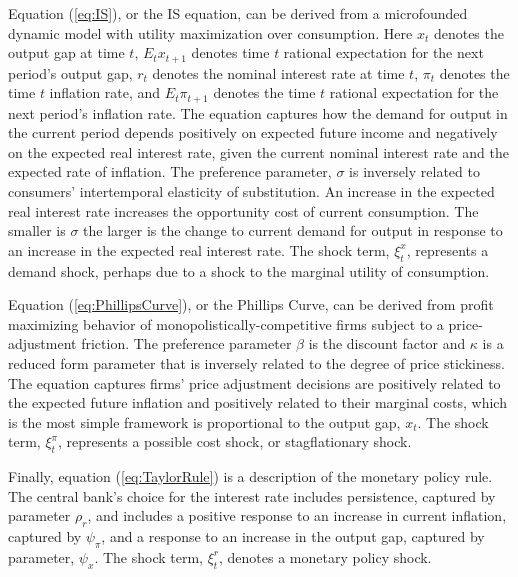 \documentclass[english,authoryear,12pt]{elsarticle}
\begin{document}
Equation (\ref{eq:IS}), or the IS equation, can be derived from a microfounded dynamic model with utility maximization over consumption. Here $x_t$ denotes the output gap at time $t$, $E_t x_{t+1}$ denotes time $t$ rational expectation for the next period's output gap, $r_t$ denotes the nominal interest rate at time $t$, $\pi_t$ denotes the time $t$ inflation rate, and  $E_t \pi_{t+1}$ denotes the time $t$ rational expectation for the next period's inflation rate. The equation captures how the demand for output in the current period depends positively on expected future income and negatively on the expected real interest rate, given the current nominal interest rate and the expected rate of inflation. The preference parameter, $\sigma$ is inversely related to consumers' intertemporal elasticity of substitution. An increase in the expected real interest rate increases the opportunity cost of current consumption. The smaller is $\sigma$ the larger is the change to current demand for output in response to an increase in the expected real interest rate. The shock term, $\xi_t^x$, represents a demand shock, perhaps due to a shock to the marginal utility of consumption.

Equation (\ref{eq:PhillipsCurve}), or the Phillips Curve, can be derived from profit maximizing behavior of monopolistically-competitive firms subject to a price-adjustment friction. The preference parameter $\beta$ is the discount factor and $\kappa$ is a reduced form parameter that is inversely related to the degree of price stickiness. The equation captures firms' price adjustment decisions are positively related to the expected future inflation and positively related to their marginal costs, which is the most simple framework is proportional to the output gap, $x_t$. The shock term, $\xi_t^\pi$, represents a possible cost shock, or stagflationary shock.

Finally, equation (\ref{eq:TaylorRule}) is a description of the monetary policy rule. The central bank's choice for the interest rate includes persistence, captured by parameter $\rho_r$, and includes a positive response to an increase in current inflation, captured by $\psi_\pi$, and a response to an increase in the output gap, captured by parameter, $\psi_x$. The shock term, $\xi_t^r$, denotes a monetary policy shock.
\end{document}
